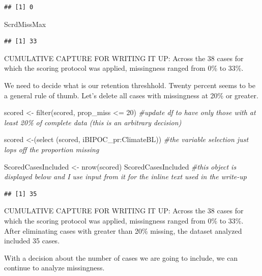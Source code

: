 \documentclass[
  english,
]{book}
\newenvironment{Shaded}{\begin{snugshade}}{\end{snugshade}}
\newcommand{\CommentTok}[1]{\textcolor[rgb]{0.56,0.35,0.01}{\textit{#1}}}
\newcommand{\DecValTok}[1]{\textcolor[rgb]{0.00,0.00,0.81}{#1}}
\newcommand{\FunctionTok}[1]{\textcolor[rgb]{0.00,0.00,0.00}{#1}}
\newcommand{\NormalTok}[1]{#1}
\newcommand{\OtherTok}[1]{\textcolor[rgb]{0.56,0.35,0.01}{#1}}
\newcommand{\SpecialCharTok}[1]{\textcolor[rgb]{0.00,0.00,0.00}{#1}}
\begin{document}
\begin{verbatim}
## [1] 0
\end{verbatim}

\begin{Shaded}
\begin{Highlighting}[]
\NormalTok{ScrdMissMax}
\end{Highlighting}
\end{Shaded}

\begin{verbatim}
## [1] 33
\end{verbatim}

CUMULATIVE CAPTURE FOR WRITING IT UP: Across the 38 cases for which the scoring protocol was applied, missingness ranged from 0\% to 33\%.

We need to decide what is our retention threshhold. Twenty percent seems to be a general rule of thumb. Let's delete all cases with missingness at 20\% or greater.

\begin{Shaded}
\begin{Highlighting}[]
\NormalTok{scored }\OtherTok{\textless{}{-}} \FunctionTok{filter}\NormalTok{(scored, prop\_miss }\SpecialCharTok{\textless{}=} \DecValTok{20}\NormalTok{)  }\CommentTok{\#update df to have only those with at least 20\% of complete data (this is an arbitrary decision)}

\NormalTok{scored }\OtherTok{\textless{}{-}}\NormalTok{(}\FunctionTok{select}\NormalTok{ (scored, iBIPOC\_pr}\SpecialCharTok{:}\NormalTok{ClimateBL)) }\CommentTok{\#the variable selection just lops off the proportion missing}

\NormalTok{ScoredCasesIncluded }\OtherTok{\textless{}{-}} \FunctionTok{nrow}\NormalTok{(scored)}
\NormalTok{ScoredCasesIncluded }\CommentTok{\#this object is displayed below and I use input from  it for the inline text used in the write{-}up}
\end{Highlighting}
\end{Shaded}

\begin{verbatim}
## [1] 35
\end{verbatim}

CUMULATIVE CAPTURE FOR WRITING IT UP: Across the 38 cases for which the scoring protocol was applied, missingness ranged from 0\% to 33\%. After eliminating cases with greater than 20\% missing, the dataset analyzed included 35 cases.

With a decision about the number of cases we are going to include, we can continue to analyze missingness.
\end{document}
